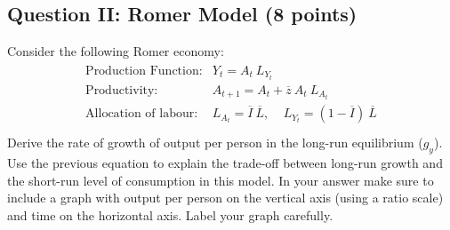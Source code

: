 \documentclass[letterpaper,12pt]{article}
\theoremstyle{dotlessS}
\begin{document}
\subsection*{Question II: Romer Model (8 points)}
Consider the following Romer economy: 
\begin{eqnarray*}
\begin{array}{ll}
\text{Production Function:} & Y_t=A_t  \: L_{Y_t} \\[1.4ex]
\text{Productivity:} & A_{t+1}=A_t+\overline{z} \: A_t \: L_{A_{t}}  \\[1.4ex]
\text{Allocation of labour:} & L_{A_{t}}=\overline{I} \: \overline{L}, \: \: \:  \: \: L_{Y_{t}}=(1-\overline{I}) \: \overline{L}  \\[1.4ex]
\end{array}
\end{eqnarray*}
Derive the rate of growth of output per person in the long-run equilibrium ($g_y$). Use the previous equation to explain the trade-off between long-run growth and the short-run level of consumption in this model. In your answer make sure to include a graph with output per person on the vertical axis (using a ratio scale) and time on the horizontal axis. Label your graph carefully.
\end{document}
